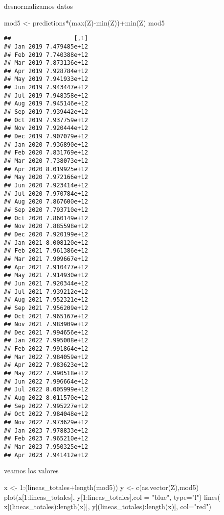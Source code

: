 \documentclass[
]{book}
\newenvironment{Shaded}{\begin{snugshade}}{\end{snugshade}}
\newcommand{\AttributeTok}[1]{\textcolor[rgb]{0.77,0.63,0.00}{#1}}
\newcommand{\DecValTok}[1]{\textcolor[rgb]{0.00,0.00,0.81}{#1}}
\newcommand{\FunctionTok}[1]{\textcolor[rgb]{0.00,0.00,0.00}{#1}}
\newcommand{\NormalTok}[1]{#1}
\newcommand{\OtherTok}[1]{\textcolor[rgb]{0.56,0.35,0.01}{#1}}
\newcommand{\SpecialCharTok}[1]{\textcolor[rgb]{0.00,0.00,0.00}{#1}}
\newcommand{\StringTok}[1]{\textcolor[rgb]{0.31,0.60,0.02}{#1}}
\begin{document}
desnormalizamos datos

\begin{Shaded}
\begin{Highlighting}[]
\NormalTok{mod5 }\OtherTok{\textless{}{-}}\NormalTok{ predictions}\SpecialCharTok{*}\NormalTok{(}\FunctionTok{max}\NormalTok{(Z)}\SpecialCharTok{{-}}\FunctionTok{min}\NormalTok{(Z))}\SpecialCharTok{+}\FunctionTok{min}\NormalTok{(Z)}
\NormalTok{mod5}
\end{Highlighting}
\end{Shaded}

\begin{verbatim}
##                  [,1]
## Jan 2019 7.479485e+12
## Feb 2019 7.740388e+12
## Mar 2019 7.873136e+12
## Apr 2019 7.928784e+12
## May 2019 7.941933e+12
## Jun 2019 7.943447e+12
## Jul 2019 7.948358e+12
## Aug 2019 7.945146e+12
## Sep 2019 7.939442e+12
## Oct 2019 7.937759e+12
## Nov 2019 7.920444e+12
## Dec 2019 7.907079e+12
## Jan 2020 7.936890e+12
## Feb 2020 7.831769e+12
## Mar 2020 7.738073e+12
## Apr 2020 8.019925e+12
## May 2020 7.972166e+12
## Jun 2020 7.923414e+12
## Jul 2020 7.970784e+12
## Aug 2020 7.867600e+12
## Sep 2020 7.793710e+12
## Oct 2020 7.860149e+12
## Nov 2020 7.885598e+12
## Dec 2020 7.920199e+12
## Jan 2021 8.008120e+12
## Feb 2021 7.961386e+12
## Mar 2021 7.909667e+12
## Apr 2021 7.910477e+12
## May 2021 7.914930e+12
## Jun 2021 7.920344e+12
## Jul 2021 7.939212e+12
## Aug 2021 7.952321e+12
## Sep 2021 7.956209e+12
## Oct 2021 7.965167e+12
## Nov 2021 7.983909e+12
## Dec 2021 7.994656e+12
## Jan 2022 7.995008e+12
## Feb 2022 7.991864e+12
## Mar 2022 7.984059e+12
## Apr 2022 7.983623e+12
## May 2022 7.990518e+12
## Jun 2022 7.996664e+12
## Jul 2022 8.005999e+12
## Aug 2022 8.011570e+12
## Sep 2022 7.995227e+12
## Oct 2022 7.984048e+12
## Nov 2022 7.973629e+12
## Jan 2023 7.978833e+12
## Feb 2023 7.965210e+12
## Mar 2023 7.950325e+12
## Apr 2023 7.941412e+12
\end{verbatim}

veamos los valores

\begin{Shaded}
\begin{Highlighting}[]
\NormalTok{x }\OtherTok{\textless{}{-}} \DecValTok{1}\SpecialCharTok{:}\NormalTok{(lineas\_totales}\SpecialCharTok{+}\FunctionTok{length}\NormalTok{(mod5))}
\NormalTok{y }\OtherTok{\textless{}{-}} \FunctionTok{c}\NormalTok{(}\FunctionTok{as.vector}\NormalTok{(Z),mod5)}
\FunctionTok{plot}\NormalTok{(x[}\DecValTok{1}\SpecialCharTok{:}\NormalTok{lineas\_totales], y[}\DecValTok{1}\SpecialCharTok{:}\NormalTok{lineas\_totales],}\AttributeTok{col =} \StringTok{"blue"}\NormalTok{, }\AttributeTok{type=}\StringTok{"l"}\NormalTok{)}
\FunctionTok{lines}\NormalTok{( x[(lineas\_totales)}\SpecialCharTok{:}\FunctionTok{length}\NormalTok{(x)], y[(lineas\_totales)}\SpecialCharTok{:}\FunctionTok{length}\NormalTok{(x)], }\AttributeTok{col=}\StringTok{"red"}\NormalTok{)}
\end{Highlighting}
\end{Shaded}
\end{document}
